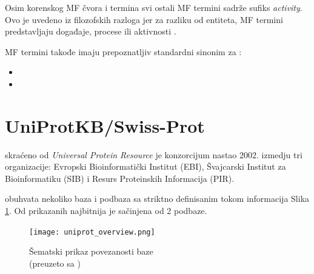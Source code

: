 Osim korenskog MF čvora i  termina svi ostali MF termini sadrže sufiks \textit{activity}.
Ovo je uvedeno iz filozofskih razloga jer za razliku od entiteta, MF termini predstavljaju događaje, procese ili aktivnosti \parencite{go_mf}.

MF termini takođe imaju prepoznatljiv standardni sinonim za  \parencite{go_mf}:
\begin{itemize}
  \item {}
  \item {}
\end{itemize}


\section{UniProtKB/Swiss-Prot}
\label{svis-prot}

\keyword{\uniprot} skraćeno od \textit{Universal Protein Resource} je konzorcijum
nastao 2002. izmedju tri organizacije: Evropski Bioinformatički
Institut (EBI), Švajcarski Institut za Bioinformatiku (SIB) i Resurs
Proteinskih Informacija (PIR).  


\uniprot obuhvata nekoliko baza i podbaza sa striktno definisanim tokom
informacija Slika \ref{fig:uniprot_overview}. Od prikazanih najbitnija je
\keyword{\uniprotkb}  sačinjena od 2 podbaze.

\begin{figure}[h!]
  \centering
  \texttt{[image: uniprot\_overview.png]}
  \caption{Šematski prikaz povezanosti \uniprot baze\\ \footnotesize (preuzeto sa \parencite{uniprot_veb})}
  \label{fig:uniprot_overview}
\end{figure}


